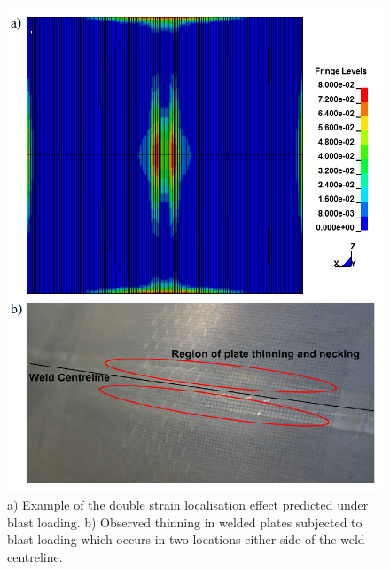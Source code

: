 \begin{figure}[h!]
	\centering
	\includegraphics[width=0.7\linewidth]{DoubleStrainPredict3}
	\caption[Mesh]{a) Example of the double strain localisation effect predicted under blast loading. b) Observed thinning in welded plates subjected to blast loading which occurs in two locations either side of the weld centreline.}
	\label{fig:BlastStrainReality}
\end{figure} 
%


